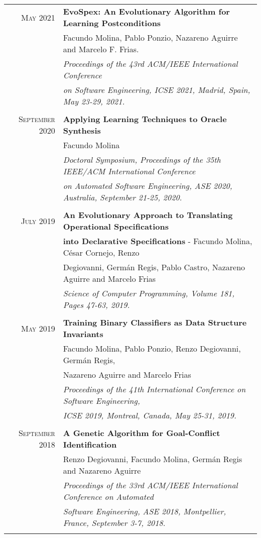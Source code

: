 \documentclass[a4paper,10pt]{article} %
\begin{document}
\begin{longtable}{rl}
\textsc{May} 2021  & \textbf{EvoSpex: An Evolutionary Algorithm for Learning Postconditions} \\
& Facundo Molina, Pablo Ponzio, Nazareno Aguirre and Marcelo F. Frias. \\
& \textit{Proceedings of the 43rd ACM/IEEE International Conference} \\
& \textit{on Software Engineering, ICSE 2021, Madrid, Spain, May 23-29, 2021.} \\ & \\

\textsc{September} 2020  & \textbf{Applying Learning Techniques to Oracle Synthesis} \\
& Facundo Molina \\
& \textit{Doctoral Symposium, Proceedings of the 35th IEEE/ACM International Conference} \\
& \textit{on Automated Software Engineering, ASE 2020, Australia, September 21-25, 2020.} \\ & \\

\textsc{July} 2019  & \textbf{An Evolutionary Approach to Translating Operational Specifications} \\ & \textbf{into Declarative Specifications} - Facundo Molina, César Cornejo, Renzo\\ 
& Degiovanni, Germán Regis, Pablo Castro, Nazareno Aguirre and Marcelo Frias \\
& \textit{Science of Computer Programming, Volume 181, Pages 47-63, 2019.} \\ & \\

\textsc{May} 2019  & \textbf{Training Binary Classifiers as Data Structure Invariants} \\ 
& Facundo Molina, Pablo Ponzio, Renzo Degiovanni, Germán Regis, \\ 
& Nazareno Aguirre and Marcelo Frias \\
& \textit{Proceedings of the 41th International Conference on Software Engineering,} \\
& \textit{ICSE 2019, Montreal, Canada, May 25-31, 2019.} \\ & \\

\textsc{September} 2018  & \textbf{A Genetic Algorithm for Goal-Conflict Identification} \\ 
& Renzo Degiovanni, Facundo Molina, Germán Regis and Nazareno Aguirre \\
& \textit{Proceedings of the 33rd ACM/IEEE International Conference on Automated } \\
& \textit{Software Engineering, ASE 2018, Montpellier, France, September 3-7, 2018.} \\ & \\


\end{longtable}
\end{document}
